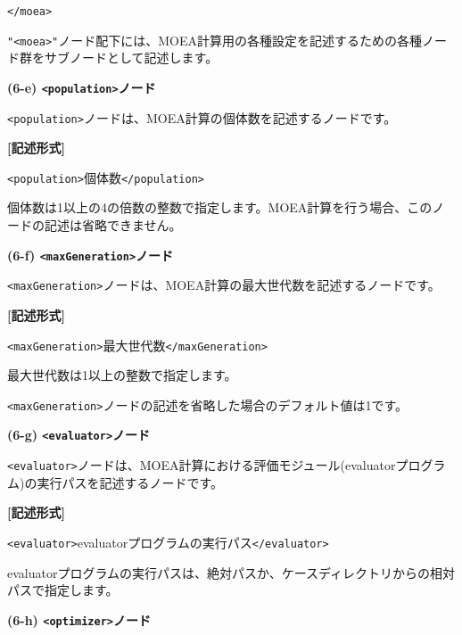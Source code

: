 \documentclass[a4paper,11pt]{jarticle}
\begin{document}
{\parindent=0pt
\texttt{</moea>}

\vspace{8pt}
\leftskip=0pt
\texttt{"<moea>"}ノード配下には、MOEA計算用の各種設定を記述するための各種ノード群をサブノードとして記述します。

\vspace{12pt}
\textbf{(6-e) \texttt{<population>}ノード}

\texttt{<population>}ノードは、MOEA計算の個体数を記述するノードです。

\vspace{8pt}
\leftskip=12pt
\textbf{[記述形式]}

\leftskip=42pt
\texttt{<population>}個体数\texttt{</population>}

\vspace{8pt}
\leftskip=0pt
個体数は1以上の4の倍数の整数で指定します。MOEA計算を行う場合、このノードの記述は省略できません。

\vspace{12pt}
\textbf{(6-f) \texttt{<maxGeneration>}ノード}

\texttt{<maxGeneration>}ノードは、MOEA計算の最大世代数を記述するノードです。

\vspace{8pt}
\leftskip=12pt
\textbf{[記述形式]}

\leftskip=42pt
\texttt{<maxGeneration>}最大世代数\texttt{</maxGeneration>}

\vspace{8pt}
\leftskip=0pt
最大世代数は1以上の整数で指定します。

\texttt{<maxGeneration>}ノードの記述を省略した場合のデフォルト値は1です。


\vspace{12pt}
\textbf{(6-g) \texttt{<evaluator>}ノード}

\texttt{<evaluator>}ノードは、MOEA計算における評価モジュール(evaluatorプログラム)の実行パスを記述するノードです。

\vspace{8pt}
\leftskip=12pt
\textbf{[記述形式]}

\leftskip=42pt
\texttt{<evaluator>}evaluatorプログラムの実行パス\texttt{</evaluator>}

\vspace{8pt}
\leftskip=0pt
evaluatorプログラムの実行パスは、絶対パスか、ケースディレクトリからの相対パスで指定します。

\vspace{12pt}
\textbf{(6-h) \texttt{<optimizer>}ノード}

}
\end{document}
